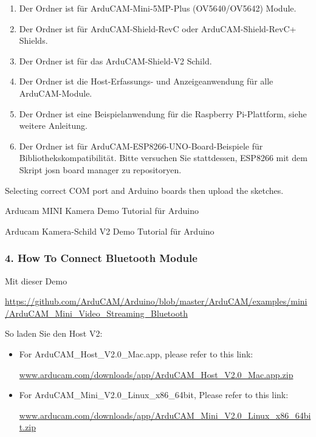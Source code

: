 \begin{enumerate}
    \item Der Ordner  ist für ArduCAM-Mini-5MP-Plus (OV5640/OV5642) Module.
    \item Der Ordner  ist für ArduCAM-Shield-RevC oder ArduCAM-Shield-RevC+ Shields.
    \item Der Ordner  ist für das ArduCAM-Shield-V2 Schild.
    \item Der Ordner  ist die Host-Erfassungs- und Anzeigeanwendung für alle ArduCAM-Module.
    \item Der Ordner  ist eine Beispielanwendung für die Raspberry Pi-Plattform, siehe weitere Anleitung.
    \item Der Ordner  ist für ArduCAM-ESP8266-UNO-Board-Beispiele für Bibliothekskompatibilität. Bitte versuchen Sie stattdessen, ESP8266 mit dem Skript josn board manager zu repositoryen.
\end{enumerate}


Selecting correct COM port and Arduino boards then upload the sketches.

\bigskip


Arducam MINI Kamera Demo Tutorial für Arduino

Arducam Kamera-Schild V2 Demo Tutorial für Arduino

\subsubsection{4. How To Connect Bluetooth Module}
Mit dieser Demo

\url{https://github.com/ArduCAM/Arduino/blob/master/ArduCAM/examples/mini/ArduCAM_Mini_Video_Streaming_Bluetooth}

So laden Sie den Host V2:

{
    
    \begin{itemize}
        \item For ArduCAM\_Host\_V2.0\_Mac.app, please refer to this link:
        
        \url{www.arducam.com/downloads/app/ArduCAM_Host_V2.0_Mac.app.zip}
        \item For ArduCAM\_Mini\_V2.0\_Linux\_x86\_64bit, Please refer to this link:
        
        \url{www.arducam.com/downloads/app/ArduCAM_Mini_V2.0_Linux_x86_64bit.zip}
    \end{itemize}
    
}


